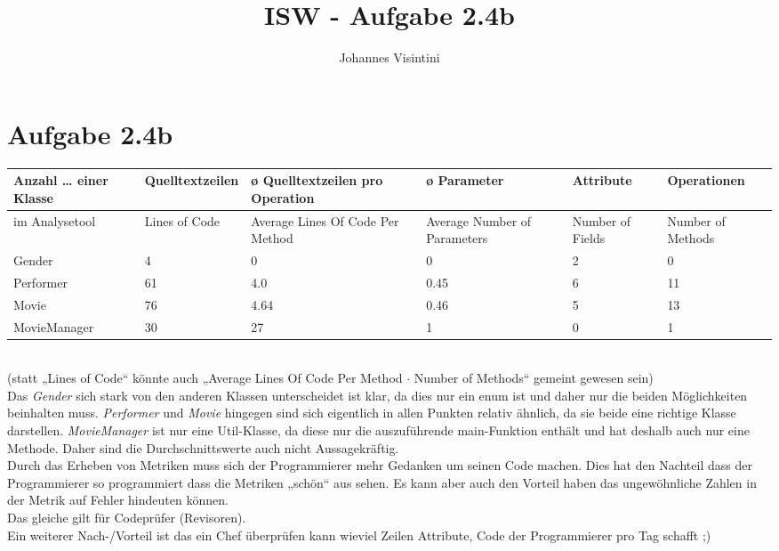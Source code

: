 \documentclass{scrartcl}
\begin{document}
\title{ISW - Aufgabe 2.4b}
\author{Johannes Visintini}
\maketitle

\section*{Aufgabe 2.4b}

\begin{tabular}{|p{3.5cm}|p{2.5cm}|p{3.5cm}|p{2.5cm}|p{2cm}|p{2.5cm}|}\hline
	Anzahl … \hspace{4em} einer Klasse &
		Quelltextzeilen &
		ø Quelltextzeilen pro Operation &
		ø Parameter &
		Attribute &
		Operationen\\\hline
	im Analysetool &
		\tiny{Lines of Code} &
		\tiny{Average Lines Of Code Per Method} &
		\tiny{Average Number of Parameters} &
		\tiny{Number of Fields} &
		\tiny{Number of Methods}\\\hline
	Gender &
		4 &
		0 &
		0 &
		2 &
		0\\\hline
	Performer &
		61 &
		4.0 &
		0.45 &
		6 &
		11\\\hline
	Movie &
		76 &
		4.64 &
		0.46 &
		5 &
		13\\\hline
	MovieManager &
		30 &
		27 &
		1 &
		0 &
		1\\\hline
\end{tabular}\\
{\tiny(statt „Lines of Code“ könnte auch „Average Lines Of Code Per Method
$\cdot$ Number of Methods“ gemeint gewesen sein)}\\

Das \textit{Gender} sich stark von den anderen Klassen unterscheidet ist
klar, da dies nur ein enum ist und daher nur die beiden Möglichkeiten
beinhalten muss. \textit{Performer} und \textit{Movie} hingegen sind sich
eigentlich in allen Punkten relativ ähnlich, da sie beide eine richtige
Klasse darstellen. \textit{MovieManager} ist nur eine Util-Klasse, da
diese nur die auszuführende main-Funktion enthält und hat deshalb auch nur
eine Methode. Daher sind die Durchschnittswerte auch nicht
Aussagekräftig.\\

Durch das Erheben von Metriken muss sich der Programmierer mehr Gedanken
um seinen Code machen. Dies hat den Nachteil dass der Programmierer so
programmiert dass die Metriken „schön“ aus sehen. Es kann aber auch den
Vorteil haben das ungewöhnliche Zahlen in der Metrik auf Fehler hindeuten
können.\\
Das gleiche gilt für Codeprüfer (Revisoren).\\
Ein weiterer Nach-/Vorteil ist das ein Chef überprüfen kann wieviel Zeilen Attribute, Code der Programmierer pro Tag schafft ;)
\end{document}
